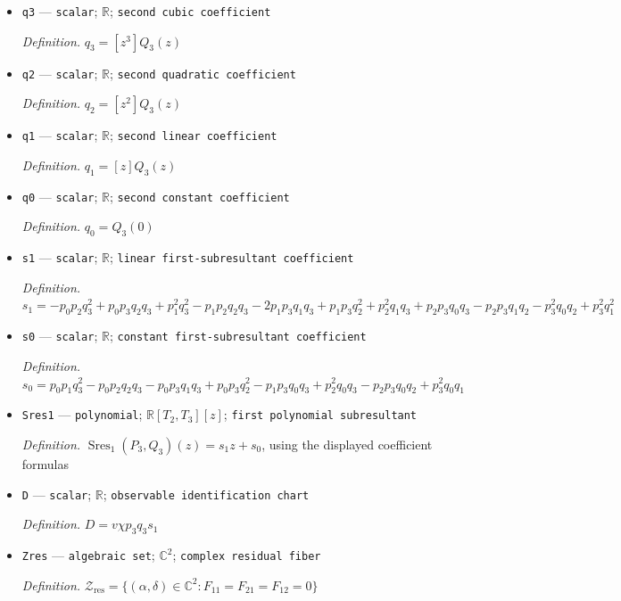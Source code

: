 \documentclass{article}
\begin{document}
\begin{itemize}
  \par\smallskip\noindent\emph{Definition.} \(p_0=P_3(0)\)
  \item \texttt{q3} --- \texttt{scalar}; \(\mathbb R\); \texttt{second cubic coefficient}
  \par\smallskip\noindent\emph{Definition.} \(q_3=[z^3]Q_3(z)\)
  \item \texttt{q2} --- \texttt{scalar}; \(\mathbb R\); \texttt{second quadratic coefficient}
  \par\smallskip\noindent\emph{Definition.} \(q_2=[z^2]Q_3(z)\)
  \item \texttt{q1} --- \texttt{scalar}; \(\mathbb R\); \texttt{second linear coefficient}
  \par\smallskip\noindent\emph{Definition.} \(q_1=[z]Q_3(z)\)
  \item \texttt{q0} --- \texttt{scalar}; \(\mathbb R\); \texttt{second constant coefficient}
  \par\smallskip\noindent\emph{Definition.} \(q_0=Q_3(0)\)
  \item \texttt{s1} --- \texttt{scalar}; \(\mathbb R\); \texttt{linear first-\allowbreak{}subresultant coefficient}
  \par\smallskip\noindent\emph{Definition.} \(s_1=-p_0p_2q_3^2+p_0p_3q_2q_3+p_1^2q_3^2-p_1p_2q_2q_3-2p_1p_3q_1q_3+p_1p_3q_2^2+p_2^2q_1q_3+p_2p_3q_0q_3-p_2p_3q_1q_2-p_3^2q_0q_2+p_3^2q_1^2\)
  \item \texttt{s0} --- \texttt{scalar}; \(\mathbb R\); \texttt{constant first-\allowbreak{}subresultant coefficient}
  \par\smallskip\noindent\emph{Definition.} \(s_0=p_0p_1q_3^2-p_0p_2q_2q_3-p_0p_3q_1q_3+p_0p_3q_2^2-p_1p_3q_0q_3+p_2^2q_0q_3-p_2p_3q_0q_2+p_3^2q_0q_1\)
  \item \texttt{Sres1} --- \texttt{polynomial}; \(\mathbb R[T_2,T_3][z]\); \texttt{first polynomial subresultant}
  \par\smallskip\noindent\emph{Definition.} \(\operatorname{Sres}_1(P_3,Q_3)(z)=s_1z+s_0\), using the displayed coefficient formulas
  \item \texttt{D} --- \texttt{scalar}; \(\mathbb R\); \texttt{observable identification chart}
  \par\smallskip\noindent\emph{Definition.} \(D=v\chi p_3q_3s_1\)
  \item \texttt{Zres} --- \texttt{algebraic set}; \(\mathbb C^2\); \texttt{complex residual fiber}
  \par\smallskip\noindent\emph{Definition.} \(\mathcal Z_{\mathrm{res}}=\{(\alpha,\delta)\in\mathbb C^2:F_{11}=F_{21}=F_{12}=0\}\)

\end{itemize}
\end{document}
